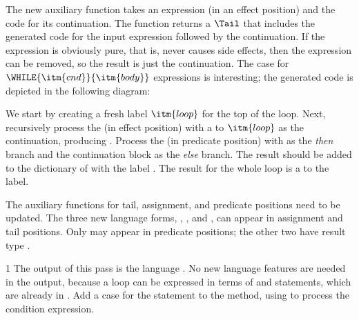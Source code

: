 \documentclass[7x10]{TimesAPriori_MIT}%
\def\pythonEd{1}
\def\edition{1}
\newcommand{\pythonColor}[0]{}
\numberwithin{theorem}{chapter}
\numberwithin{definition}{chapter}
\numberwithin{equation}{chapter}
\begin{document}
{The new auxiliary function  takes an
expression (in an effect position) and the code for its
continuation. The function returns a $\Tail$ that includes the
generated code for the input expression followed by the
continuation. If the expression is obviously pure, that is, never
causes side effects, then the expression can be removed, so the result
is just the continuation.
%
The case for $\WHILE{\itm{cnd}}{\itm{body}}$ expressions is
interesting; the generated code is depicted in the following diagram:
\begin{center}
  \begin{minipage}{0.3\textwidth}
\end{minipage}
\end{center}
We start by creating a fresh label $\itm{loop}$ for the top of the
loop.  Next, recursively process the  (in effect position)
with a  to $\itm{loop}$ as the continuation, producing
. Process the  (in predicate position) with
 as the \emph{then} branch and the continuation block as the
\emph{else} branch. The result should be added to the dictionary of
 with the label . The result for the
whole  loop is a  to the  label.

The auxiliary functions for tail, assignment, and predicate positions
need to be updated. The three new language forms, ,
, and , can appear in assignment and tail
positions.  Only  may appear in predicate positions; the
other two have result type .

\fi}
%
{\if\edition\pythonEd\pythonColor
%
The output of this pass is the language \LangCIf{}. No new language
features are needed in the output, because a  loop can be
expressed in terms of  and  statements, which are
already in \LangCIf{}.
%  
Add a case for the  statement to the
 method, using  to process
the condition expression.
%
\fi}
\end{document}
